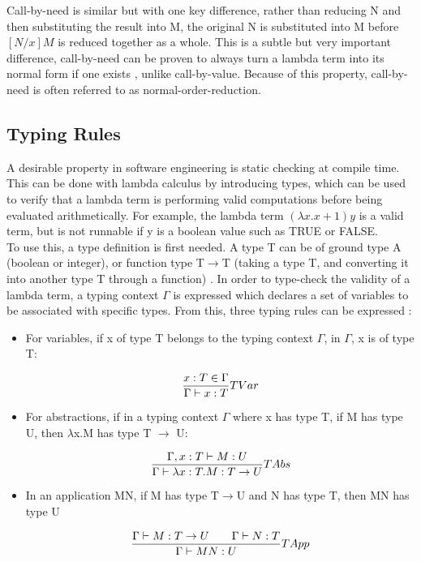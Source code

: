 \documentclass[a4paper,11pt]{report}
\begin{document}
Call-by-need is similar but with one key difference, rather than reducing N and then substituting the result into M, the original N is substituted into M before $[N / x]M$ is reduced together as a whole. This is a subtle but very important difference, call-by-need can be proven to always turn a lambda term into its normal form if one exists \cite{Horowitz2013}, unlike call-by-value. Because of this property, call-by-need is often referred to as normal-order-reduction.

\subsection{Typing Rules}

A desirable property in software engineering is static checking at compile time. This can be done with lambda calculus by introducing types, which can be used to verify that a lambda term is performing valid computations before being evaluated arithmetically. For example, the lambda term $(\lambda x.x+1)y$ is a valid term, but is not runnable if y is a boolean value such as TRUE or FALSE.\\

To use this, a type definition is first needed. A type T can be of ground type A (boolean or integer), or function type T$\rightarrow$T (taking a type T, and converting it into another type T through a function) \cite{Gay2019}. In order to type-check the validity of a lambda term, a typing context $\Gamma$ is expressed which declares a set of variables to be associated with specific types. From this, three typing rules can be expressed \cite{Gay2019}:

\begin{itemize}
	\item For variables, if x of type T belongs to the typing context $\Gamma$, in $\Gamma$, x is of type T:
	
	\begin{equation}
	\centering
	\frac{x:T\in \Gamma}{\Gamma \vdash x:T}TVar
	\label{variable_type}
	\end{equation}
	\item For abstractions, if in a typing context $\Gamma$ where x has type T, if M has type U, then $\lambda$x.M has type T $\rightarrow$ U:
	
	\begin{equation}
	\centering
	\frac{\Gamma ,x:T\vdash M:U}{\Gamma \vdash \lambda x:T.M:T \to U}TAbs
	\end{equation}
	\item  In an application MN, if M has type T$\rightarrow$U and N has type T, then MN has type U
	
	\begin{equation}
	\centering
	\frac{\Gamma \vdash M:T \to U \qquad \Gamma \vdash N:T}{\Gamma \vdash MN:U}TApp
	\label{application_types}
	\end{equation}
\end{itemize}
\end{document}
